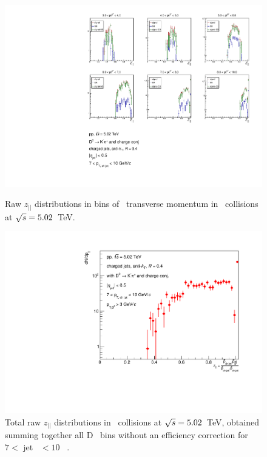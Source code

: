 \begin{figure}[bth]
\centering
\begin{minipage}{.65\textwidth}
  \centering
\includegraphics[width=\textwidth]{pp_2sig/R4_jetbin_7_10/jetRawSpectrum_pTD3}
\caption{Raw $z_{||}$ distributions in bins of \Dzero\ transverse momentum in \pp\ collisions at $\sqrt{s}=5.02$~TeV.}
\label{fig:eq_pp_signBkgJet_Dzero_7_10_R4}
\end{minipage}%
\begin{minipage}{.4\textwidth}
  \centering
\includegraphics[width=\textwidth]{pp_2sig/R4_jetbin_7_10/jetPtSpectrum_SB_pTD3}
\caption{Total raw $z_{||}$ distributions in \pp\ collisions at $\sqrt{s}=5.02$~TeV, obtained summing together all D \pt\ bins without an efficiency correction for $7<$ jet \pt\ $<10$ \GeVc\ .
}
\label{fig:eq_pp_signBkgJet_tot_7_10_R4}
\end{minipage}
\end{figure}
